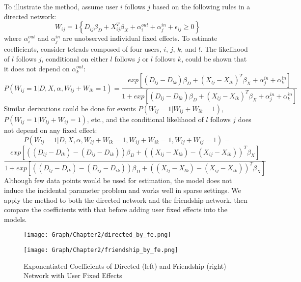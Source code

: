 To illustrate the method, assume user $i$ follows $j$ based on the following rules in a directed network:
\begin{equation}
  \nonumber
  W_{ij}=1\left\{ D_{ij} \beta_D + X_{ij}^T \beta_X + \alpha_i^{out} + \alpha_j^{in} + \epsilon_{ij} \geq 0 \right\}
\end{equation}
where $\alpha_i^{out}$ and $\alpha_j^{in}$ are unobserved individual fixed effects. To estimate coefficients, consider tetrads composed of four users, $i$, $j$, $k$, and $l$. The likelihood of $l$ follows $j$, conditional on either $l$ follows $j$ or $l$ follows $k$, could be shown that it does not depend on $\alpha_k^{out}$:
 \begin{equation}
 \nonumber
P(W_{lj}=1|D,X,\alpha,W_{lj}+W_{lk}=1)= \frac{exp\left[(D_{lj}-D_{lk})\beta_D+(X_{lj}-X_{lk})^T\beta_X+\alpha_j^{in}+\alpha_k^{in}\right]}{1+exp\left[(D_{lj}-D_{lk})\beta_D+(X_{lj}-X_{lk})^T\beta_X+\alpha_j^{in}+\alpha_k^{in}\right]}
\end{equation}
Similar derivations could be done for events $P(W_{lj}=1|W_{lj}+W_{lk}=1)$, $P(W_{lj}=1|W_{lj}+W_{ij}=1)$, etc., and the conditional likelihood of $l$ follows $j$ does not depend on any fixed effect:
\begin{equation}
\nonumber
P(W_{lj}=1|D,X,\alpha,W_{lj}+W_{lk}=1,W_{ij}+W_{ik}=1,W_{lj}+W_{ij}=1)=
\end{equation}
\begin{equation}
\nonumber
\frac{exp\left[((D_{lj}-D_{lk})-(D_{ij}-D_{ik}))\beta_D+((X_{lj}-X_{lk})-(X_{ij}-X_{ik}))^T\beta_X\right]}{1+exp\left[((D_{lj}-D_{lk})-(D_{ij}-D_{ik}))\beta_D+((X_{lj}-X_{lk})-(X_{ij}-X_{ik}))^T\beta_X\right]}
\end{equation}
Although few data points would be used for estimation, the model does not induce the incidental parameter problem and works well in sparse settings. We apply the method to both the directed network and the friendship network, then compare the coefficients with that before adding user fixed effects into the models.

\begin{figure} \centering
  \begin{minipage}[t]{0.45\textwidth}
    \centering
    \texttt{[image: Graph/Chapter2/directed\_by\_fe.png]}
  \end{minipage}
  \begin{minipage}[t]{0.45\textwidth} \centering
    \texttt{[image: Graph/Chapter2/friendship\_by\_fe.png]}
  \end{minipage}
  \caption{Exponentiated Coefficients of Directed (left) and Friendship (right) Network with User Fixed Effects}
\end{figure}

